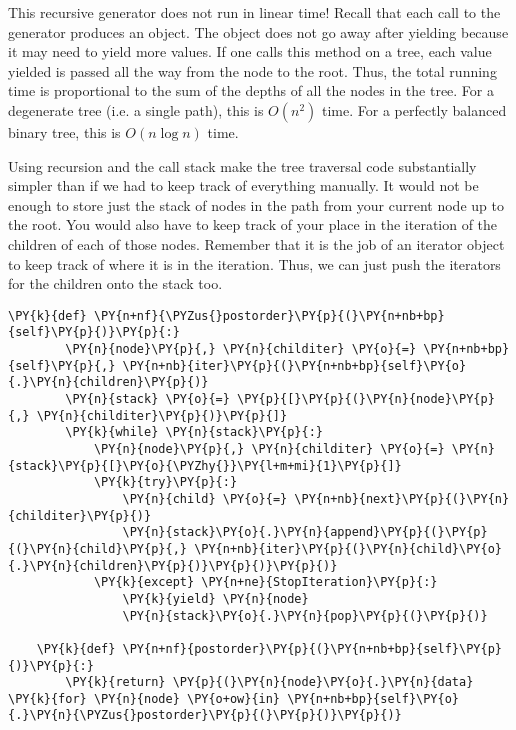 This recursive generator does not run in linear time!
Recall that each call to the generator produces an object.
The object does not go away after yielding because it may need to yield more values.
If one calls this method on a tree, each value yielded is passed all the way from the node to the root.
Thus, the total running time is proportional to the sum of the depths of all the nodes in the tree.
For a degenerate tree (i.e. a single path), this is $O(n^2)$ time.
For a perfectly balanced binary tree, this is $O(n \log n)$ time.


Using recursion and the call stack make the tree traversal code substantially simpler than if we had to keep track of everything manually.
It would not be enough to store just the stack of nodes in the path from your current node up to the root. You would also have to keep track of your place in the iteration of the children of each of those nodes.  Remember that it is the job of an iterator object to keep track of where it is in the iteration. Thus, we can just push the iterators for the children onto the stack too.

\begin{Verbatim}[commandchars=\\\{\}]
    \PY{k}{def} \PY{n+nf}{\PYZus{}postorder}\PY{p}{(}\PY{n+nb+bp}{self}\PY{p}{)}\PY{p}{:}
        \PY{n}{node}\PY{p}{,} \PY{n}{childiter} \PY{o}{=} \PY{n+nb+bp}{self}\PY{p}{,} \PY{n+nb}{iter}\PY{p}{(}\PY{n+nb+bp}{self}\PY{o}{.}\PY{n}{children}\PY{p}{)}
        \PY{n}{stack} \PY{o}{=} \PY{p}{[}\PY{p}{(}\PY{n}{node}\PY{p}{,} \PY{n}{childiter}\PY{p}{)}\PY{p}{]}
        \PY{k}{while} \PY{n}{stack}\PY{p}{:}
            \PY{n}{node}\PY{p}{,} \PY{n}{childiter} \PY{o}{=} \PY{n}{stack}\PY{p}{[}\PY{o}{\PYZhy{}}\PY{l+m+mi}{1}\PY{p}{]}
            \PY{k}{try}\PY{p}{:}
                \PY{n}{child} \PY{o}{=} \PY{n+nb}{next}\PY{p}{(}\PY{n}{childiter}\PY{p}{)}
                \PY{n}{stack}\PY{o}{.}\PY{n}{append}\PY{p}{(}\PY{p}{(}\PY{n}{child}\PY{p}{,} \PY{n+nb}{iter}\PY{p}{(}\PY{n}{child}\PY{o}{.}\PY{n}{children}\PY{p}{)}\PY{p}{)}\PY{p}{)}
            \PY{k}{except} \PY{n+ne}{StopIteration}\PY{p}{:}
                \PY{k}{yield} \PY{n}{node}
                \PY{n}{stack}\PY{o}{.}\PY{n}{pop}\PY{p}{(}\PY{p}{)}                 

    \PY{k}{def} \PY{n+nf}{postorder}\PY{p}{(}\PY{n+nb+bp}{self}\PY{p}{)}\PY{p}{:}
        \PY{k}{return} \PY{p}{(}\PY{n}{node}\PY{o}{.}\PY{n}{data} \PY{k}{for} \PY{n}{node} \PY{o+ow}{in} \PY{n+nb+bp}{self}\PY{o}{.}\PY{n}{\PYZus{}postorder}\PY{p}{(}\PY{p}{)}\PY{p}{)}
\end{Verbatim}



